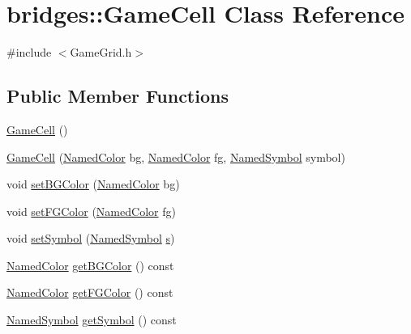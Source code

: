 \hypertarget{classbridges_1_1_game_cell}{}\section{bridges\+::Game\+Cell Class Reference}
\label{classbridges_1_1_game_cell}


{\ttfamily \#include $<$Game\+Grid.\+h$>$}

\subsection*{Public Member Functions}
\begin{DoxyCompactItemize}
\item 
\mbox{\hyperlink{classbridges_1_1_game_cell_ad498aad8d6cb4d3e956f19071a8ae201}{Game\+Cell}} ()
\item 
\mbox{\hyperlink{classbridges_1_1_game_cell_a5c6b1800cd495ef394112eecaf76eb16}{Game\+Cell}} (\mbox{\hyperlink{namespacebridges_ad811207d8898a7fd6b72a74725e68357}{Named\+Color}} bg, \mbox{\hyperlink{namespacebridges_ad811207d8898a7fd6b72a74725e68357}{Named\+Color}} fg, \mbox{\hyperlink{namespacebridges_acfb0a4f7877d8f63de3e6862004c50ed}{Named\+Symbol}} symbol)
\item 
void \mbox{\hyperlink{classbridges_1_1_game_cell_a9fcc58283b9f6fb770f27ae30233afe6}{set\+B\+G\+Color}} (\mbox{\hyperlink{namespacebridges_ad811207d8898a7fd6b72a74725e68357}{Named\+Color}} bg)
\item 
void \mbox{\hyperlink{classbridges_1_1_game_cell_a6e67986a1e6d64a33da9109ed7245a3b}{set\+F\+G\+Color}} (\mbox{\hyperlink{namespacebridges_ad811207d8898a7fd6b72a74725e68357}{Named\+Color}} fg)
\item 
void \mbox{\hyperlink{classbridges_1_1_game_cell_a3a10764d65796da2727b7f99324b229e}{set\+Symbol}} (\mbox{\hyperlink{namespacebridges_acfb0a4f7877d8f63de3e6862004c50ed}{Named\+Symbol}} \mbox{\hyperlink{namespacebridges_acfb0a4f7877d8f63de3e6862004c50eda03c7c0ace395d80182db07ae2c30f034}{s}})
\item 
\mbox{\hyperlink{namespacebridges_ad811207d8898a7fd6b72a74725e68357}{Named\+Color}} \mbox{\hyperlink{classbridges_1_1_game_cell_a781afb078bedaba909f124eddd543056}{get\+B\+G\+Color}} () const
\item 
\mbox{\hyperlink{namespacebridges_ad811207d8898a7fd6b72a74725e68357}{Named\+Color}} \mbox{\hyperlink{classbridges_1_1_game_cell_af33d2a831608968e4c2dd53692aafac8}{get\+F\+G\+Color}} () const
\item 
\mbox{\hyperlink{namespacebridges_acfb0a4f7877d8f63de3e6862004c50ed}{Named\+Symbol}} \mbox{\hyperlink{classbridges_1_1_game_cell_af6bb157599096b8149a69b227414becb}{get\+Symbol}} () const
\end{DoxyCompactItemize}


